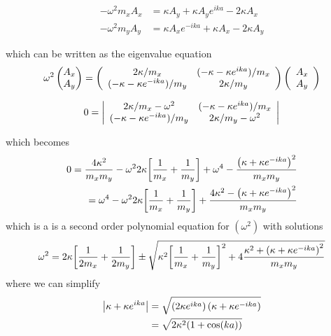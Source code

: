 \documentclass[12p,a4paper]{article}
\renewcommand{\exp}{e^}
\renewcommand{\exp}{e^}
\begin{document}
\begin{align*} - \omega ^ { 2 } m_x A _ { x } & = \kappa A _ { y } + \kappa A _ { y } e ^ { i k a } - 2 \kappa A _ { x } \\ - \omega ^ { 2 } m_y A _ { y } & = \kappa A _ { x } e ^ { - i k a } + \kappa A _ { x } -  2\kappa A _ { y } \end{align*}

which can be written as the eigenvalue equation
\begin{align*}
    \omega^2
    \begin{pmatrix}A_x \\ A_y \end{pmatrix}
    =
\left( \begin{array} { c c } { 2\kappa/m_x } & { (-\kappa - \kappa e ^ { i k a })/m_x } \\ { (- \kappa - \kappa e ^ { - i k a })/m_y } & { 2\kappa/m_y } \end{array} \right) \left( \begin{array} { c } { A _ { x } } \\ { A _ { y } } \end{array} \right)
\end{align*}

\begin{align*} 0 = \left| \begin{array} { c c } { 2 \kappa /m_x - \omega ^ { 2 } } & { (- \kappa - \kappa e ^ { i k a })/m_x } \\ { (- \kappa - \kappa e ^ { - i k a })/m_y } & { 2\kappa /m_y - \omega ^ { 2 } } \end{array} \right| \end{align*}

which becomes
\begin{align*}
    0 = \frac{4 \kappa^2}{m_xm_y} - \omega^2 2\kappa\qty[\frac{1}{m_x} + \frac{1}{m_y}] + \omega^4 - \frac{\qty(\kappa + \kappa\exp{-ika})^2}{m_xm_y} \\
    = \omega^4
    - \omega^2 2\kappa\qty[\frac{1}{m_x} + \frac{1}{m_y}]
    + \frac{4\kappa^2 - \qty(\kappa + \kappa\exp{-ika})^2}{m_xm_y}
\end{align*}
which is a is a second order polynomial equation for $(\omega^2)$ with solutions
\begin{align*}
    \omega^2 = 2\kappa \qty[\frac{1}{2m_x} + \frac{1}{2m_y}] \pm \sqrt{\kappa^2\qty[\frac{1}{m_x} + \frac{1}{m_y}]^2 + 4\frac{\kappa^2 + \qty(\kappa + \kappa\exp{-ika})^2}{m_xm_y} }
\end{align*}
where we can simplify
\begin{align*} \left| \kappa + \kappa e ^ { i k a } \right| & = \sqrt { \left( 2\kappa e ^ { i k a } \right) \left( \kappa + \kappa e ^ { - i k a } \right) } \\ & = \sqrt { 2\kappa ^ { 2 }  \qty( 1 + \cos ( k a ) ) }  \end{align*}
\end{document}
